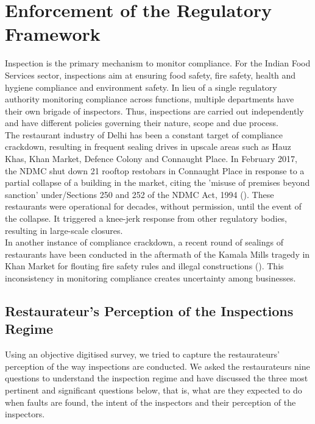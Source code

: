 \documentclass[a4paper, 12pt]{article}
\begin{document}
		

	
		\section{Enforcement of the Regulatory Framework}
		\label{sec:2}
		
		Inspection is the primary mechanism to monitor compliance. For the Indian Food Services sector, inspections aim at ensuring food safety, fire safety, health and hygiene compliance and environment safety. In lieu of a single regulatory authority 
monitoring compliance across functions, multiple departments have their own brigade of inspectors. Thus, inspections are carried out independently and have different policies governing their nature, scope and due process.\\
		
		The restaurant industry of Delhi has been a constant target of compliance crackdown, resulting in frequent sealing drives in upscale areas such as Hauz Khas, Khan Market, Defence Colony and Connaught Place. In February 2017, the NDMC shut down 
21 rooftop restobars in Connaught Place in response to a partial collapse of a building in the market, citing the 'misuse of premises beyond sanction' under/Sections 250 and 252 of the NDMC Act, 1994 (\cite{toi2017rooftopbanCP}). These restaurants were 
operational for decades, without permission, until the event of the collapse. It triggered a knee-jerk response from other regulatory bodies, resulting in large-scale closures.\\
		
		In another instance of compliance crackdown, a recent round of sealings of restaurants have been conducted in the aftermath of the Kamala Mills tragedy in Khan Market for flouting fire safety rules and illegal constructions (\cite{fp2018khanmarketsealing}). This 
inconsistency in monitoring compliance creates uncertainty among businesses.
		
		\subsection{Restaurateur’s Perception of the Inspections Regime}
		Using an objective digitised survey, we tried to capture the restaurateurs’ perception of the way inspections are conducted. We asked the restaurateurs nine questions to understand the inspection regime and have discussed the three most pertinent and 
significant questions below, that is, what are they expected to do when faults are found, the intent of the inspectors and their perception of the inspectors.
		
\end{document}
